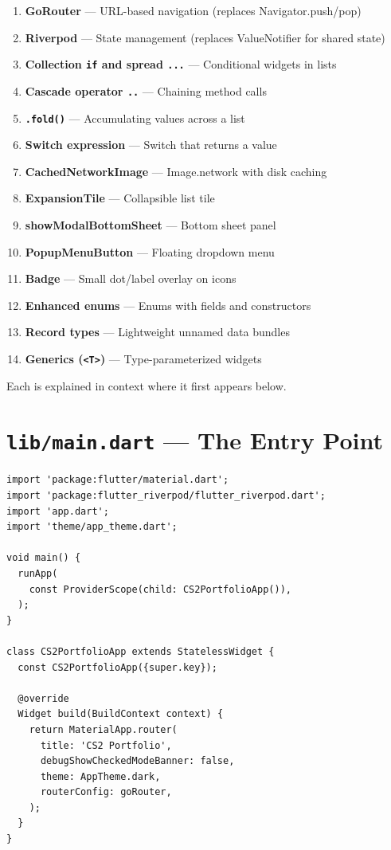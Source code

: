 \documentclass[11pt, a4paper]{article}
\begin{document}
\begin{enumerate}
    \item \textbf{GoRouter} --- URL-based navigation (replaces Navigator.push/pop)
    \item \textbf{Riverpod} --- State management (replaces ValueNotifier for shared state)
    \item \textbf{Collection \texttt{if} and spread \texttt{...}} --- Conditional widgets in lists
    \item \textbf{Cascade operator \texttt{..}} --- Chaining method calls
    \item \textbf{\texttt{.fold()}} --- Accumulating values across a list
    \item \textbf{Switch expression} --- Switch that returns a value
    \item \textbf{CachedNetworkImage} --- Image.network with disk caching
    \item \textbf{ExpansionTile} --- Collapsible list tile
    \item \textbf{showModalBottomSheet} --- Bottom sheet panel
    \item \textbf{PopupMenuButton} --- Floating dropdown menu
    \item \textbf{Badge} --- Small dot/label overlay on icons
    \item \textbf{Enhanced enums} --- Enums with fields and constructors
    \item \textbf{Record types} --- Lightweight unnamed data bundles
    \item \textbf{Generics (\texttt{<T>})} --- Type-parameterized widgets
\end{enumerate}

Each is explained in context where it first appears below.

\newpage

\section{\texttt{lib/main.dart} --- The Entry Point}

\begin{lstlisting}
import 'package:flutter/material.dart';
import 'package:flutter_riverpod/flutter_riverpod.dart';
import 'app.dart';
import 'theme/app_theme.dart';

void main() {
  runApp(
    const ProviderScope(child: CS2PortfolioApp()),
  );
}

class CS2PortfolioApp extends StatelessWidget {
  const CS2PortfolioApp({super.key});

  @override
  Widget build(BuildContext context) {
    return MaterialApp.router(
      title: 'CS2 Portfolio',
      debugShowCheckedModeBanner: false,
      theme: AppTheme.dark,
      routerConfig: goRouter,
    );
  }
}
\end{lstlisting}
\end{document}
